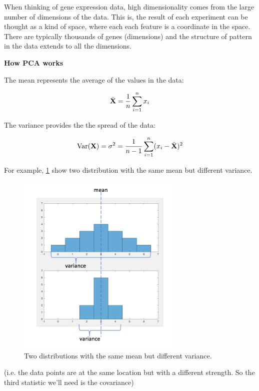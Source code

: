 \documentclass[11pt, oneside]{article}   	%
\begin{document}
When thinking of gene expression data, high dimensionality comes from the large number of dimensions of the data. This is, the result of each experiment can be thought as a kind of space, where each each feature is a coordinate in the space. There are typically thousands of genes (dimensions) and the structure of pattern in the data extends to all the dimensions. 


{\bf How PCA works}

The mean represents the average of the values in the data:

\begin{equation}
   \bar{{\bf X}} = \frac{1}{n} \sum_{i=1}^{n} x_i 
\end{equation}

The variance provides the the spread of the data:

\begin{equation}
   \text{Var} ({\bf X}) = \sigma^2  = \frac{1}{n-1} \sum_{i=1}^{n} ( x_i -  \bar{{\bf X}})^2
\end{equation}


For example, \ref{fig:MeanVariance} show two distribution with the same mean but different variance. 

\begin{figure}[!h]
	\centering
	\includegraphics[width=0.7\textwidth]{same-mean_different-variance}
	\caption{Two distributions with the same mean but different variance.}
	\label{fig:MeanVariance}
\end{figure}


(i.e. the data points are at the same location but with a different strength. So the third statistic we'll need is the covariance)
\end{document}
